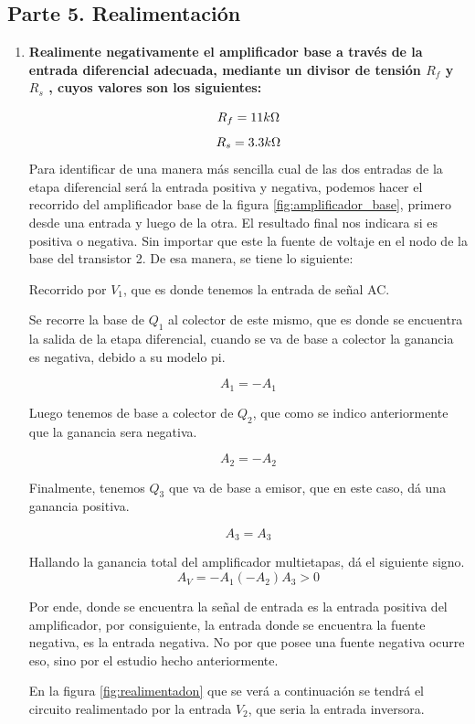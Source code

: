 \subsection{Parte 5. Realimentación}
\begin{enumerate}
  \item \textbf{Realimente negativamente el amplificador base a través de la entrada diferencial adecuada, mediante un divisor de tensión $R_f$ y $R_s$ , cuyos valores son los siguientes:}

        $$R_f=11k\ohm$$
        $$R_s=3.3k\ohm$$
        Para identificar de una manera más sencilla cual de las dos entradas de la etapa diferencial será la entrada positiva y negativa, podemos hacer el recorrido del amplificador base de la figura \ref{fig:amplificador_base}, primero desde una entrada y luego de la otra. El resultado final nos indicara si es positiva o negativa. Sin importar que este la fuente de voltaje en el nodo de la base del transistor 2. De esa manera, se tiene lo siguiente:

        Recorrido por $V_1$, que es donde tenemos la entrada de señal AC.

        Se recorre la base de $Q_1$ al colector de este mismo, que es donde se encuentra la salida de la etapa diferencial, cuando se va de base a colector la ganancia es negativa, debido a su modelo pi.

        $$A_1=-A_1$$

        Luego tenemos de base a colector de $Q_2$, que como se indico anteriormente que la ganancia sera negativa.

        $$A_2=-A_2$$

        Finalmente, tenemos $Q_3$ que va de base a emisor, que en este caso, dá una ganancia positiva.

        $$A_3=A_3$$

        Hallando la ganancia total del amplificador multietapas, dá el siguiente signo.
        $$A_V=-A_1(-A_2)A_3>0$$

        Por ende, donde se encuentra la señal de entrada es la entrada positiva del amplificador, por consiguiente, la entrada donde se encuentra la fuente negativa, es la entrada negativa. No por que posee una fuente negativa ocurre eso, sino por el estudio hecho anteriormente.

        En la figura \ref{fig:realimentadon} que se verá a continuación se tendrá el circuito realimentado por la entrada $V_2$, que seria la entrada inversora.


\end{enumerate}
